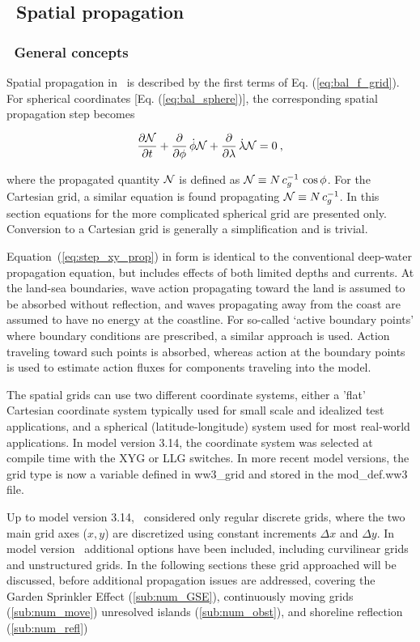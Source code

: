 \vssub
\subsection{~Spatial propagation} \label{sub:xy_prop}
\vssub
\subsubsection{~General concepts}
\vsssub

Spatial propagation in \ws\ is described by the first terms of
Eq. (\ref{eq:bal_f_grid}). For spherical coordinates
[Eq. (\ref{eq:bal_sphere})], the corresponding spatial propagation step
becomes


\begin{equation}
\frac{\partial {\cal N}}{\partial t} + \frac{\partial}{\partial \phi} \, \dot{\phi} {\cal N} +
\frac{\partial}{\partial \lambda} \, \dot{\lambda} {\cal N} = 0
\: , \label{eq:step_xy_prop} 
\end{equation}

\noindent 
where the propagated quantity ${\cal N}$ is defined as ${\cal N} \equiv N \, c_g^{-1} \,
\cos\phi$. For the Cartesian grid, a similar equation is found propagating
${\cal N} \equiv N \, c_g^{-1}$. In this section equations for the more complicated
spherical grid are presented only. Conversion to a Cartesian grid is generally
a simplification and is trivial.

Equation~(\ref{eq:step_xy_prop}) in form is identical to the conventional
deep-water propagation equation, but includes effects of both limited depths
and currents. At the land-sea boundaries, wave action propagating toward the
land is assumed to be absorbed without reflection, and waves propagating away
from the coast are assumed to have no energy at the coastline. For so-called
`active boundary points' where boundary conditions are prescribed, a similar
approach is used. Action traveling toward such points is absorbed, whereas
action at the boundary points is used to estimate action fluxes for components
traveling into the model.

The spatial grids can use two different coordinate systems, either a 'flat'
Cartesian coordinate system typically used for small scale and idealized test
applications, and a spherical (latitude-longitude) system used for most
real-world applications. In model version 3.14, the coordinate system was
selected at compile time with the {\code XYG} or {\code LLG} switches. In more
recent model versions, the grid type is now a variable defined in {\file
ww3\_grid} and stored in the {\file mod\_def.ww3} file.

Up to model version 3.14, \ws\ considered only regular discrete grids, where
the two main grid axes ($x,y$) are discretized using constant increments
$\Delta x$ and $\Delta y$. In model version \WWver\ additional options have
been included, including curvilinear grids and unstructured grids. In the
following sections these grid approached will be discussed, before additional
propagation issues are addressed, covering the Garden Sprinkler Effect
(\ref{sub:num_GSE}), continuously moving grids (\ref{sub:num_move}) unresolved
islands (\ref{sub:num_obst}), and shoreline reflection (\ref{sub:num_refl})
